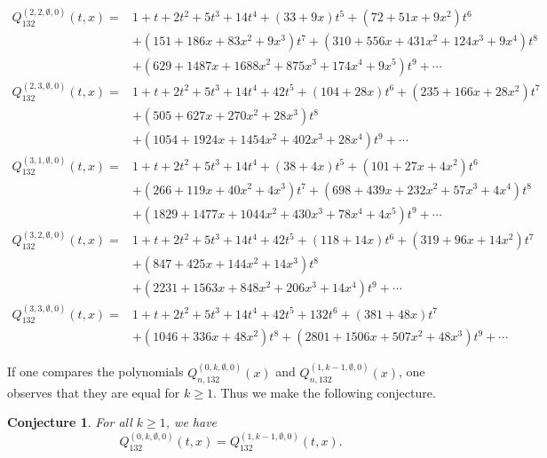 \documentclass[
final,nomarks
]{dmtcs-episciences}
\newtheorem{conjecture}{Conjecture}
\newcommand{\Qmm}[1]{Q_{132}^{(#1)}(t,x)}
\newcommand{\Qmmn}[2]{Q_{#2,132}^{(#1)}(x)}
\begin{document}
\begin{align}
\Qmm{2,2,\emptyset,0}=&1+t+2 t^2+5 t^3+14 t^4+(33+9 x) t^5+\left(72+51 x+9 x^2\right)
t^6\nonumber\\\nonumber
&+\left(151+186 x+83 x^2+9 x^3\right) t^7+\left(310+556 x+431 x^2+124
x^3+9 x^4\right) t^8\\
&+\left(629+1487 x+1688 x^2+875 x^3+174 x^4+9 x^5\right)
t^9+\cdots
\\
\Qmm{2,3,\emptyset,0}=&1+t+2 t^2+5 t^3+14 t^4+42 t^5+(104+28 x) t^6+\left(235+166 x+28 x^2\right)
t^7\nonumber\\\nonumber
&+\left(505+627 x+270 x^2+28 x^3\right) t^8\\
&+\left(1054+1924 x+1454 x^2+402
x^3+28 x^4\right) t^9+\cdots
\\
\Qmm{3,1,\emptyset,0}=&1+t+2 t^2+5 t^3+14 t^4+(38+4 x) t^5+\left(101+27 x+4 x^2\right)
t^6\nonumber\\\nonumber
&+\left(266+119 x+40 x^2+4 x^3\right) t^7+\left(698+439 x+232 x^2+57 x^3+4
x^4\right) t^8\\
&+\left(1829+1477 x+1044 x^2+430 x^3+78 x^4+4 x^5\right)
t^9+\cdots
\\
\Qmm{3,2,\emptyset,0}=&1+t+2 t^2+5 t^3+14 t^4+42 t^5+(118+14 x) t^6+\left(319+96 x+14 x^2\right)
t^7\nonumber\\\nonumber
&+\left(847+425 x+144 x^2+14 x^3\right) t^8\\
&+\left(2231+1563 x+848 x^2+206
x^3+14 x^4\right) t^9+\cdots
\\
\Qmm{3,3,\emptyset,0}=&1+t+2 t^2+5 t^3+14 t^4+42 t^5+132 t^6+(381+48 x) t^7\nonumber\\
&+\left(1046+336 x+48
x^2\right) t^8+\left(2801+1506 x+507 x^2+48 x^3\right)
t^9+\cdots
\end{align}



If one compares the polynomials \begin{math}\Qmmn{0,k,\emptyset,0}{n}\end{math} 
and \begin{math}\Qmmn{1,k-1,\emptyset,0}{n}\end{math}, one observes that they are equal for \begin{math}k \geq 1\end{math}. Thus 
we make the following conjecture.
\begin{conjecture}
	For all \begin{math}k\geq 1\end{math}, we have
	\begin{equation}
		\Qmm{0,k,\emptyset,0}=\Qmm{1,k-1,\emptyset,0}.
	\end{equation}
\end{conjecture}
\end{document}
